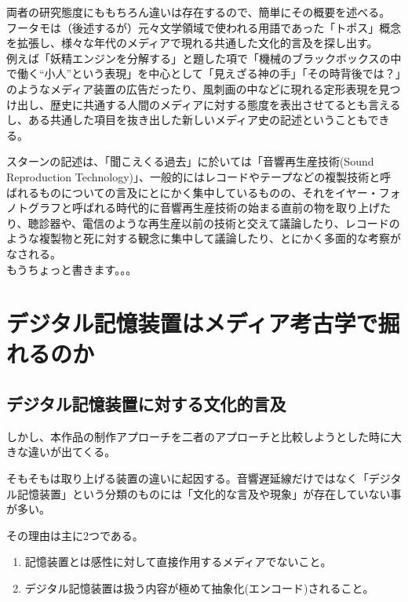 両者の研究態度にももちろん違いは存在するので、簡単にその概要を述べる。\\
フータモは（後述するが）元々文学領域で使われる用語であった「トポス」概念を拡張し、様々な年代のメディアで現れる共通した文化的言及を探し出す。\\
例えば「妖精エンジンを分解する」と題した項で「機械のブラックボックスの中で働く``小人''という表現」を中心として「見えざる神の手」「その時背後では？」のようなメディア装置の広告だったり、風刺画の中などに現れる定形表現を見つけ出し、歴史に共通する人間のメディアに対する態度を表出させてるとも言えるし、ある共通した項目を抜き出した新しいメディア史の記述ということもできる。

スターンの記述は、「聞こえくる過去」に於いては「音響再生産技術(Sound
Reproduction
Technology)」、一般的にはレコードやテープなどの複製技術と呼ばれるものについての言及にとにかく集中しているものの、それをイヤー・フォノトグラフと呼ばれる時代的に音響再生産技術の始まる直前の物を取り上げたり、聴診器や、電信のような再生産以前の技術と交えて議論したり、レコードのような複製物と死に対する観念に集中して議論したり、とにかく多面的な考察がなされる。\\
もうちょっと書きます。。。

\section{デジタル記憶装置はメディア考古学で掘れるのか}\label{ux30c7ux30b8ux30bfux30ebux8a18ux61b6ux88c5ux7f6eux306fux30e1ux30c7ux30a3ux30a2ux8003ux53e4ux5b66ux3067ux6398ux308cux308bux306eux304b}

\subsection{デジタル記憶装置に対する文化的言及}\label{ux30c7ux30b8ux30bfux30ebux8a18ux61b6ux88c5ux7f6eux306bux5bfeux3059ux308bux6587ux5316ux7684ux8a00ux53ca}

しかし、本作品の制作アプローチを二者のアプローチと比較しようとした時に大きな違いが出てくる。

そもそもは取り上げる装置の違いに起因する。音響遅延線だけではなく「デジタル記憶装置」という分類のものには「文化的な言及や現象」が存在していない事が多い。

その理由は主に2つである。

\begin{enumerate}
\def\labelenumi{\arabic{enumi}.}
\tightlist
\item
  記憶装置とは感性に対して直接作用するメディアでないこと。
\item
  デジタル記憶装置は扱う内容が極めて抽象化(エンコード)されること。
\end{enumerate}


